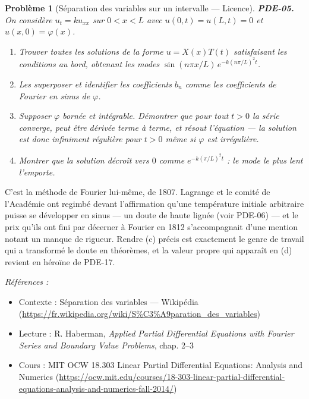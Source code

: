 \documentclass[11pt]{article}
\newtheorem{problem}{Problème}
\newenvironment{refs}{\par\small\noindent\emph{Références :}\begin{itemize}\setlength\itemsep{0pt}}{\end{itemize}\normalsize}
\begin{document}
\bigskip

\begin{problem}[{Séparation des variables sur un intervalle --- Licence}]
\textbf{PDE-05.} On considère $u_t = k u_{xx}$ sur $0 < x < L$
avec $u(0,t) = u(L,t) = 0$ et $u(x,0) = \varphi(x)$.
\begin{enumerate}
\item[(a)] Trouver toutes les solutions
de la forme $u = X(x)T(t)$ satisfaisant les conditions au bord, obtenant les modes
$\sin(n\pi x/L)\,e^{-k(n\pi/L)^2 t}$.
\item[(b)] Les superposer et identifier les
coefficients $b_n$ comme les coefficients de Fourier en sinus de $\varphi$.
\item[(c)] Supposer
$\varphi$ bornée et intégrable. Démontrer que pour tout $t > 0$ la série
converge, peut être dérivée terme à terme, et résout l'équation --- la solution est donc
infiniment régulière pour $t > 0$ même si $\varphi$ est irrégulière.
\item[(d)] Montrer que la solution décroît vers $0$ comme $e^{-k(\pi/L)^2 t}$ : le mode le plus lent
l'emporte.
\end{enumerate}

\end{problem}

\noindent C'est la méthode de Fourier lui-même, de 1807. Lagrange et le comité de
l'Académie ont regimbé devant l'affirmation qu'une température initiale arbitraire puisse se
développer en sinus --- un doute de haute lignée (voir PDE-06) --- et le prix qu'ils ont fini par
décerner à Fourier en 1812 s'accompagnait d'une mention notant un manque de rigueur. Rendre (c)
précis est exactement le genre de travail qui a transformé le doute en théorèmes, et la valeur
propre qui apparaît en (d) revient en héroïne de PDE-17.

\begin{refs}
\item Contexte : Séparation des variables --- Wikipédia (\url{https://fr.wikipedia.org/wiki/S%C3%A9paration_des_variables})
\item Lecture : R. Haberman, \textit{Applied Partial Differential Equations with Fourier Series and Boundary Value Problems}, chap. 2--3
\item Cours : MIT OCW 18.303 Linear Partial Differential Equations: Analysis and Numerics (\url{https://ocw.mit.edu/courses/18-303-linear-partial-differential-equations-analysis-and-numerics-fall-2014/})
\end{refs}
\end{document}
